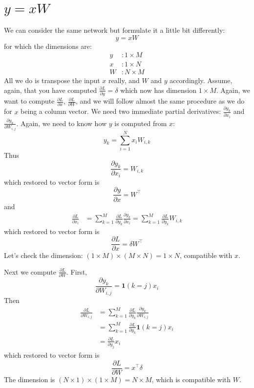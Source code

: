 \documentclass{article}
\begin{document}
\section{$y = xW$}
We can consider the same network but formulate it a little bit differently:
\begin{equation}
    y = xW
\end{equation}
for which the dimensions are:
\begin{align}
    y &: 1 \times M \\
    x &: 1 \times N \\
    W &: N \times M
\end{align}
All we do is transpose the input $x$ really, and $W$ and $y$ accordingly. Assume, again, that you have computed $\frac{\partial L}{\partial y} = \delta$ which now has dimension $1\times M$. Again, we want to compute $\frac{\partial L}{\partial x}$, $\frac{\partial L}{\partial W}$, and we will follow almost the same procedure as we do for $x$ being a column vector. We need two immediate partial derivatives: $\frac{\partial y_k}{\partial x_i}$ and $\frac{\partial y_k}{\partial W_{i, j}}$. Again, we need to know how $y$ is computed from $x$:
\begin{equation}
    y_k = \sum_{i = 1}^N x_iW_{i, k}
\end{equation}
Thus 
\begin{equation}
    \frac{\partial y_k}{\partial x_i} = W_{i, k} 
\end{equation}
which restored to vector form is
\begin{equation}
    \frac{\partial y}{\partial x} = W^\top
\end{equation}
and
\begin{align}
   \frac{\partial L}{\partial x_i} 
   &= \sum_{k=1}^M\frac{\partial L}{\partial y_k}\frac{\partial y_k}{\partial x_i} = \sum_{k=1}^M\frac{\partial L}{\partial y_k}W_{i, k} 
\end{align}
which restored to vector form is
\begin{equation}
    \frac{\partial L}{\partial x} = \delta W^\top
\end{equation}
Let's check the dimension: $(1\times M) \times (M \times N) = 1 \times N$, compatible with $x$.

Next we compute $\frac{\partial L}{\partial W}$. First, 
\begin{equation}
    \frac{\partial y_k}{\partial W_{i, j}} = \mathbf{1}(k=j)x_i
\end{equation}
Then
\begin{align}
    \frac{\partial L}{\partial W_{i, j}} 
    &= \sum_{k=1}^M\frac{\partial L}{\partial y_k}\frac{\partial y_k}{\partial W_{i, j}} \\ 
    &= \sum_{k=1}^M\frac{\partial L}{\partial y_k}\mathbf{1}(k=j)x_i \\
    &= \frac{\partial L}{\partial y_j}x_i
\end{align}
which restored to vector form is
\begin{equation}
    \frac{\partial L}{\partial W} = x^\top\delta
\end{equation}
The dimension is $(N\times 1) \times (1 \times M) = N \times M$, which is compatible with $W$.
\end{document}
